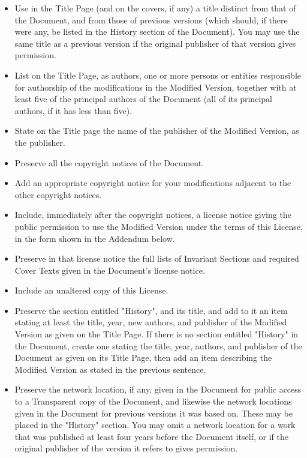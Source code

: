 	\begin{itemize}
		\item Use in the Title Page (and on the covers, if any) a title distinct from that of the Document, and from those of previous versions (which should, if there were any, be listed in the History section of the Document). You may use the same title as a previous version if the original publisher of that version gives permission. 

		\item List on the Title Page, as authors, one or more persons or entities responsible for authorship of the modifications in the Modified Version, together with at least five of the principal authors of the Document (all of its principal authors, if it has less than five). 

		\item State on the Title page the name of the publisher of the Modified Version, as the publisher. 

		\item Preserve all the copyright notices of the Document. 

		\item Add an appropriate copyright notice for your modifications adjacent to the other copyright notices. 

		\item Include, immediately after the copyright notices, a license notice giving the public permission to use the Modified Version under the terms of this License, in the form shown in the Addendum below. 

		\item Preserve in that license notice the full lists of Invariant Sections and required Cover Texts given in the Document's license notice. 

		\item Include an unaltered copy of this License. 

		\item Preserve the section entitled "History", and its title, and add to it an item stating at least the title, year, new authors, and publisher of the Modified Version as given on the Title Page. If there is no section entitled "History" in the Document, create one stating the title, year, authors, and publisher of the Document as given on its Title Page, then add an item describing the Modified Version as stated in the previous sentence. 

		\item Preserve the network location, if any, given in the Document for public access to a Transparent copy of the Document, and likewise the network locations given in the Document for previous versions it was based on. These may be placed in the "History" section. You may omit a network location for a work that was published at least four years before the Document itself, or if the original publisher of the version it refers to gives permission. 


\end{itemize}
